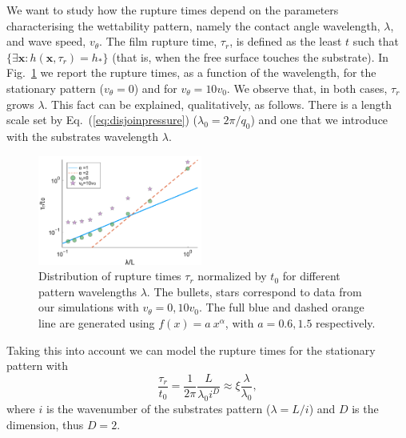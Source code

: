 \documentclass[twocolumn,amsmath,amssymb,showpacs,pre,nofootinbib,superscriptaddress]{revtex4-1} %
\begin{document}
We want to study how the rupture times depend on the parameters characterising the wettability pattern, namely the contact angle
wavelength, $\lambda$, and wave speed, $v_{\theta}$.
The film rupture time, $\tau_r$, is defined as the least $t$ such that $\{\exists\mathbf{x}: h(\mathbf{x},\tau_r)=h_{\ast}\}$ (that is, when the
free surface touches the substrate).
In Fig.~\ref{fig:model_rt} we report the rupture times, as a function of the wavelength, for the stationary pattern ($v_{\theta}=0$) and
for $v_{\theta}=10 v_0$. We observe that, in both cases, $\tau_r$ grows $\lambda$.
This fact can be explained, qualitatively, as follows.
There is a length scale set by Eq.~(\ref{eq:disjoinpressure}) ($\lambda_0 = 2\pi/q_0$) and one that we introduce with the substrates wavelength $\lambda$.
\begin{figure}
    \centering
    \includegraphics[width=0.48\textwidth]{Figures/Rupture_times_over_lambda_with_powerlaw.pdf}
    \caption{Distribution of rupture times $\tau_r$ normalized by $t_0$ for different pattern wavelengths $\lambda$.
    The bullets, stars correspond to data from our simulations with $v_{\theta} = 0, 10v_0$.
    The full blue and dashed orange line are generated using $f(x) = a~x^{\alpha}$, with $a=0.6,1.5$ respectively.
    }
    \label{fig:model_rt}
\end{figure}
Taking this into account we can model the rupture times for the stationary pattern with
\begin{equation}\label{eq:model_tr}
    \frac{\tau_r}{t_0} = \frac{1}{2\pi}\frac{L}{\lambda_0 i^D}\approx \xi\frac{\lambda}{\lambda_0},    
\end{equation}
where $i$ is the wavenumber of the substrates pattern ($\lambda = L/i$) and $D$ is the dimension, thus $D=2$.
\end{document}
